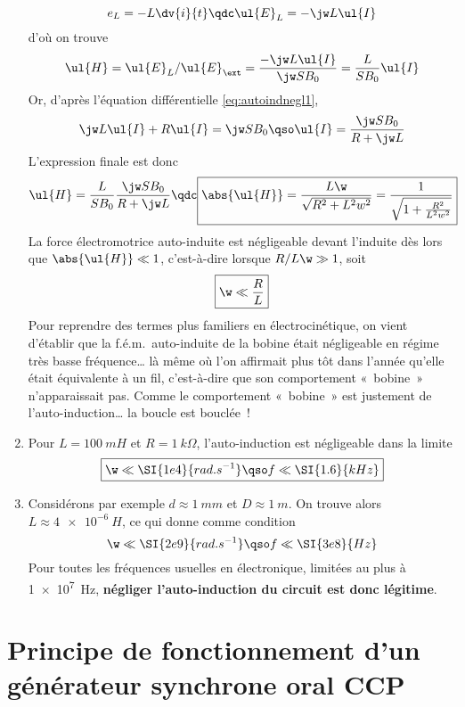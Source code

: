 \documentclass[a4paper, 10pt, final, garamond]{book}
\begin{document}
\begin{enumerate}
	      \[
		      e_{L} = -L\dv{i}{t}
		      \qdc
		      \ul{E}_{L} = -\jw L \ul{I}
	      \]
	      d'où on trouve
	      \[
		      \ul{H} = \ul{E}_{L}/\ul{E}_{\ext} =
		      \frac{-\jw L \ul{I}}{\jw S B_0} = \frac{L}{SB_0} \ul{I}
	      \]
	      Or, d'après l'équation différentielle \eqref{eq:autoindnegl1},
	      \[
		      \jw L \ul{I} + R \ul{I} = \jw SB_0
		      \qso
		      \ul{I} = \frac{\jw SB_0}{R + \jw L}
	      \]
	      L'expression finale est donc
	      \[
		      \ul{H} = \frac{L}{SB_0} \frac{\jw SB_0}{R + \jw L}
		      \qdc
		      \boxed{\abs{\ul{H}} = \frac{L\w}{\sqrt{R^2 + L^2w^2}}
			      = \frac{1}{\sqrt{1+\frac{R^2}{L^2w^2}}}}
	      \]
	      La force électromotrice auto-induite est négligeable devant l'induite
	      dès lors que $\abs{\ul{H}} \ll 1$, c'est-à-dire lorsque $R/L\w \gg 1$,
	      soit
	      \[
		      \boxed{\w \ll \frac{R}{L}}
	      \]
	      Pour reprendre des termes plus familiers en électrocinétique, on vient
	      d’établir que la f.é.m.\ auto-induite de la bobine était négligeable en
	      régime très basse fréquence… là même où l'on affirmait plus tôt dans
	      l'année qu'elle était équivalente à un fil, c'est-à-dire que son
	      comportement «~bobine~» n’apparaissait pas. Comme le comportement
	      «~bobine~» est justement de l'auto-induction… la boucle est bouclée~!
	\item Pour $L = \SI{100}{mH}$ et $R = \SI{1}{k\Omega}$, l'auto-induction est
	      négligeable dans la limite
	      \[
		      \boxed{
			      \w \ll \SI{1e4}{rad.s^{-1}}
			      \qso
			      f \ll \SI{1.6}{kHz}}
	      \]
	\item Considérons par exemple $d \approx \SI{1}{mm}$ et $D \approx \SI{1}{m}$.
	      On trouve alors $L \approx \SI{4e-6}{H}$, ce qui donne comme condition
	      \[
		      \w \ll \SI{2e9}{rad.s^{-1}}
		      \qso
		      f \ll \SI{3e8}{Hz}
	      \]
	      Pour toutes les fréquences usuelles en électronique, limitées au plus à
	      \SI{1e7}{Hz}, \textbf{négliger l'auto-induction du circuit est donc
		      légitime}.
\end{enumerate}

\section{Principe de fonctionnement d'un générateur synchrone \hfill \small oral
  CCP}
\label{sec:motsynchcorr}
\end{document}
